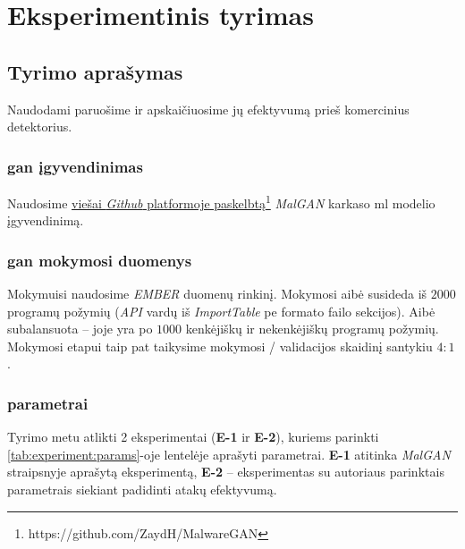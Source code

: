 \section{Eksperimentinis tyrimas}\label{sec:experiment}

\subsection{Tyrimo aprašymas}
Naudodami   paruošime
 ir apskaičiuosime jų efektyvumą prieš komercinius
detektorius.

\subsubsection{\acs{gan} įgyvendinimas}

Naudosime \href{https://github.com/ZaydH/MalwareGAN}{viešai \textit{Github}
    platformoje paskelbtą\footnote{https://github.com/ZaydH/MalwareGAN}}
\textit{MalGAN} karkaso \acs{ml} modelio įgyvendinimą.



\subsubsection{\acs{gan} mokymosi duomenys} Mokymuisi naudosime \textit{EMBER}
\cite{andersonEMBEROpenDataset2018a} duomenų rinkinį. Mokymosi aibė susideda iš
$2000$ programų požymių (\textit{API} vardų iš \textit{ImportTable} \acs{pe}
formato failo sekcijos). Aibė subalansuota -- joje yra po $1000$ kenkėjiškų ir
nekenkėjiškų programų požymių. Mokymosi etapui taip pat taikysime mokymosi /
validacijos skaidinį santykiu $4:1$.

\subsubsection{ parametrai}

Tyrimo metu atlikti 2 eksperimentai (\textbf{E-1} ir \textbf{E-2}), kuriems
parinkti \ref{tab:experiment:params}-oje lentelėje aprašyti parametrai.
\textbf{E-1} atitinka \textit{MalGAN} straipsnyje
\cite{huGeneratingAdversarialMalware2017} aprašytą eksperimentą, \textbf{E-2}
-- eksperimentas su autoriaus parinktais parametrais siekiant padidinti atakų
efektyvumą.

